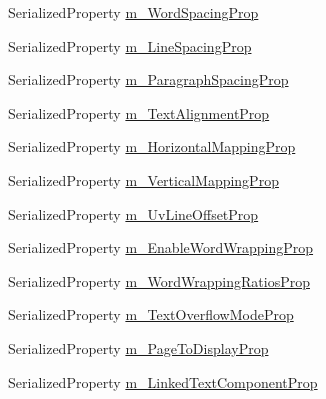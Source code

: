 \begin{DoxyCompactItemize}
\item 
Serialized\+Property \mbox{\hyperlink{class_t_m_pro_1_1_editor_utilities_1_1_t_m_p___base_editor_panel_a15d8f6c601287972e3f3830cbd63a23a}{m\+\_\+\+Word\+Spacing\+Prop}}
\item 
Serialized\+Property \mbox{\hyperlink{class_t_m_pro_1_1_editor_utilities_1_1_t_m_p___base_editor_panel_a55d0808bad545be2c3bf762f489d475d}{m\+\_\+\+Line\+Spacing\+Prop}}
\item 
Serialized\+Property \mbox{\hyperlink{class_t_m_pro_1_1_editor_utilities_1_1_t_m_p___base_editor_panel_aa4b46399f8c1a4f09173822a8cc67971}{m\+\_\+\+Paragraph\+Spacing\+Prop}}
\item 
Serialized\+Property \mbox{\hyperlink{class_t_m_pro_1_1_editor_utilities_1_1_t_m_p___base_editor_panel_ae3b79e0d4d8b4adc00bb4fa9f4fbc03c}{m\+\_\+\+Text\+Alignment\+Prop}}
\item 
Serialized\+Property \mbox{\hyperlink{class_t_m_pro_1_1_editor_utilities_1_1_t_m_p___base_editor_panel_a9ec82653be31e8f08bfdf965d64a79cd}{m\+\_\+\+Horizontal\+Mapping\+Prop}}
\item 
Serialized\+Property \mbox{\hyperlink{class_t_m_pro_1_1_editor_utilities_1_1_t_m_p___base_editor_panel_a98c4276ba6fedc0f646c5b4e6022daa1}{m\+\_\+\+Vertical\+Mapping\+Prop}}
\item 
Serialized\+Property \mbox{\hyperlink{class_t_m_pro_1_1_editor_utilities_1_1_t_m_p___base_editor_panel_ab043c50b5c668b92b163b3ef5ad6b09e}{m\+\_\+\+Uv\+Line\+Offset\+Prop}}
\item 
Serialized\+Property \mbox{\hyperlink{class_t_m_pro_1_1_editor_utilities_1_1_t_m_p___base_editor_panel_a3da763451f243427dc1c3d224ab96b4d}{m\+\_\+\+Enable\+Word\+Wrapping\+Prop}}
\item 
Serialized\+Property \mbox{\hyperlink{class_t_m_pro_1_1_editor_utilities_1_1_t_m_p___base_editor_panel_ad99dafe311151e21a8061a38cd7a6992}{m\+\_\+\+Word\+Wrapping\+Ratios\+Prop}}
\item 
Serialized\+Property \mbox{\hyperlink{class_t_m_pro_1_1_editor_utilities_1_1_t_m_p___base_editor_panel_a0d34c4e05948f74f1f0fc53ac89c20bb}{m\+\_\+\+Text\+Overflow\+Mode\+Prop}}
\item 
Serialized\+Property \mbox{\hyperlink{class_t_m_pro_1_1_editor_utilities_1_1_t_m_p___base_editor_panel_a81c9e4b08b9e98a24382060e7b93c163}{m\+\_\+\+Page\+To\+Display\+Prop}}
\item 
Serialized\+Property \mbox{\hyperlink{class_t_m_pro_1_1_editor_utilities_1_1_t_m_p___base_editor_panel_af12e503a44feb01cc9f5bb0bf49ad4d8}{m\+\_\+\+Linked\+Text\+Component\+Prop}}

\end{DoxyCompactItemize}
